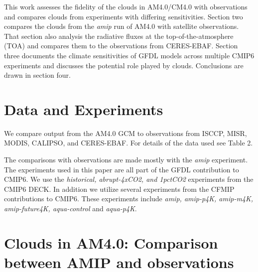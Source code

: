 \documentclass[draft]{agujournal2019}
\begin{document}
This work assesses the fidelity of the clouds in AM4.0/CM4.0 with observations and compares clouds from experiments 
with differing sensitivities. 
Section two compares the clouds from the \textit{amip} run of AM4.0 with satellite observations.  That section also 
analysis the radiative fluxes at the top-of-the-atmosphere (TOA) and compares them to the observations from 
CERES-EBAF.    Section three documents the climate sensitivities of GFDL models across multiple CMIP6 experiments 
and discusses the potential role played by clouds.   Conclusions are drawn in section four.  

\section{Data and Experiments}

We compare output from the AM4.0 GCM to observations from ISCCP, MISR, MODIS, CALIPSO, and CERES-EBAF.
For details of the data used see Table 2.

The comparisons with observations are made mostly with the \textit{amip} experiment.   The experiments used 
in this paper are all part of the GFDL contribution to CMIP6.  We use the \textit{historical, abrupt-4xCO2, and 1pctCO2}
experiments from the CMIP6 DECK.  In addition we utilize several experiments from the CFMIP contributions 
to CMIP6.  These experiments include \textit{amip, amip-p4K, amip-m4K, amip-future4K, aqua-control} and \textit{aqua-p4K}. 



\section{Clouds in AM4.0: Comparison between AMIP and observations}

\end{document}
